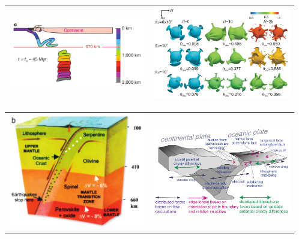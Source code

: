 \begin{tabular}{p{8cm}p{8cm}}
\includegraphics[width=6cm]{images/beautiful/simi13} \cite{simi13} &
\includegraphics[width=6cm]{images/beautiful/oflb13} \cite{oflb13} \\ \hline
\end{tabular}


\begin{tabular}{p{8cm}p{8cm}}
\includegraphics[width=6cm]{images/beautiful/gree07} \cite{gree07} &
\includegraphics[width=6cm]{images/beautiful/beoc01} \cite{beoc01} \\
\end{tabular}

\begin{center}
\end{center}

